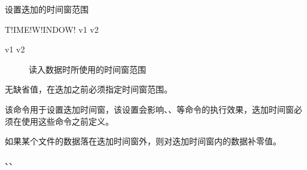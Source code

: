 \label{sss:timewindow}

设置迭加的时间窗范围

\begin{SACSTX}
T!IME!W!INDOW! v1 v2
\end{SACSTX}

\begin{description}
\item [v1 v2] 读入数据时所使用的时间窗范围
\end{description}

无缺省值，在迭加之前必须指定时间窗范围。

该命令用于设置迭加时间窗，该设置会影响、、等命令的执行效果，迭加时间窗必须在使用这些命令之前定义。

如果某个文件的数据落在迭加时间窗外，则对迭加时间窗内的数据补零值。

、、
